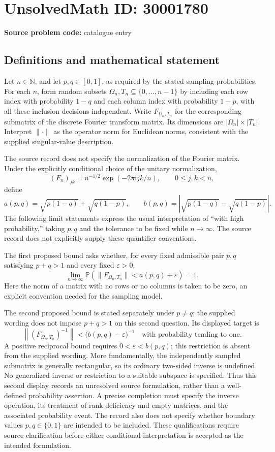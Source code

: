 \documentclass[11pt]{article}
\newcommand{\N}{\mathbb{N}}
\begin{document}
\section*{UnsolvedMath ID: 30001780}
\textbf{Source problem code:} catalogue entry
\subsection{Definitions and mathematical statement}
Let \(n\in\N\), and let \(p,q\in[0,1]\), as required by the stated sampling probabilities. For each \(n\), form random subsets \(\Omega_n,T_n\subseteq\{0,\ldots,n-1\}\) by including each row index with probability \(1-q\) and each column index with probability \(1-p\), with all these inclusion decisions independent. Write \(F_{\Omega_n,T_n}\) for the corresponding submatrix of the discrete Fourier transform matrix. Its dimensions are \(|\Omega_n|\times|T_n|\). Interpret \(\|\cdot\|\) as the operator norm for Euclidean norms, consistent with the supplied singular-value description.

The source record does not specify the normalization of the Fourier matrix. Under the explicitly conditional choice of the unitary normalization,
\[
(F_n)_{jk}=n^{-1/2}\exp(-2\pi\mathrm{i}jk/n),\qquad 0\le j,k<n,
\]
define
\[
a(p,q)=\sqrt{p(1-q)}+\sqrt{q(1-p)},\qquad
b(p,q)=\left|\sqrt{p(1-q)}-\sqrt{q(1-p)}\right|.
\]
The following limit statements express the usual interpretation of ``with high probability,'' taking \(p,q\) and the tolerance to be fixed while \(n\to\infty\). The source record does not explicitly supply these quantifier conventions.

The first proposed bound asks whether, for every fixed admissible pair \(p,q\) satisfying \(p+q>1\) and every fixed \(\varepsilon>0\),
\[
\lim_{n\to\infty}\mathbb{P}\!\left(
\|F_{\Omega_n,T_n}\|<a(p,q)+\varepsilon
\right)=1.
\]
Here the norm of a matrix with no rows or no columns is taken to be zero, an explicit convention needed for the sampling model.

The second proposed bound is stated separately under \(p\ne q\); the supplied wording does not impose \(p+q>1\) on this second question. Its displayed target is
\[
\left\|(F_{\Omega_n,T_n})^{-1}\right\|
<\bigl(b(p,q)-\varepsilon\bigr)^{-1}
\quad\text{with probability tending to one.}
\]
A positive reciprocal bound requires \(0<\varepsilon<b(p,q)\); this restriction is absent from the supplied wording. More fundamentally, the independently sampled submatrix is generally rectangular, so its ordinary two-sided inverse is undefined. No generalized inverse or restriction to a suitable subspace is specified. Thus this second display records an unresolved source formulation, rather than a well-defined probability assertion. A precise completion must specify the inverse operation, its treatment of rank deficiency and empty matrices, and the associated probability event. The record also does not specify whether boundary values \(p,q\in\{0,1\}\) are intended to be included. These qualifications require source clarification before either conditional interpretation is accepted as the intended formulation.
\end{document}
